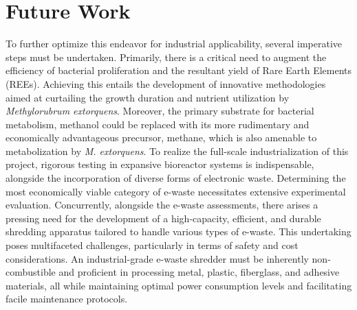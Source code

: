 \chapter{Future Work\authorB{}}

To further optimize this endeavor for industrial applicability, several imperative steps must be undertaken.
Primarily, there is a critical need to augment the efficiency of bacterial proliferation and the resultant yield of Rare Earth Elements (REEs).
Achieving this entails the development of innovative methodologies aimed at curtailing the growth duration and nutrient utilization by \emph{Methylorubrum extorquens}.
Moreover, the primary substrate for bacterial metabolism, methanol could be replaced with its more rudimentary and economically advantageous precursor, methane, which is also amenable to metabolization by \emph{M. extorquens}.
To realize the full-scale industrialization of this project, rigorous testing in expansive bioreactor systems is indispensable, alongside the incorporation of diverse forms of electronic waste.
Determining the most economically viable category of e-waste necessitates extensive experimental evaluation.
Concurrently, alongside the e-waste assessments, there arises a pressing need for the development of a high-capacity, efficient, and durable shredding apparatus tailored to handle various types of e-waste.
This undertaking poses multifaceted challenges, particularly in terms of safety and cost considerations.
An industrial-grade e-waste shredder must be inherently non-combustible and proficient in processing metal, plastic, fiberglass, and adhesive materials, all while maintaining optimal power consumption levels and facilitating facile maintenance protocols.